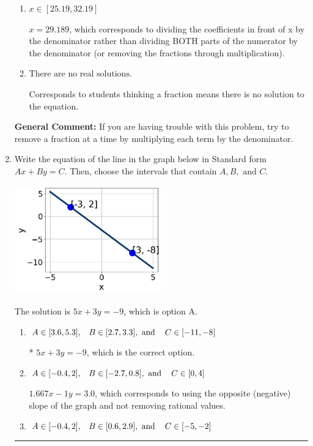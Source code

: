 \documentclass{extbook}[14pt]
\newcommand{\litem}[1]{\item #1

\rule{\textwidth}{0.4pt}}
\begin{document}
\begin{enumerate}
{\begin{enumerate}[label=\Alph*.]
 $x = -1.865$, which corresponds to not distributing the negative in front of the second fraction.
\item \( x \in [25.19, 32.19] \)

 $x = 29.189$, which corresponds to dividing the coefficients in front of x by the denominator rather than dividing BOTH parts of the numerator by the denominator (or removing the fractions through multiplication).
\item \( \text{There are no real solutions.} \)

Corresponds to students thinking a fraction means there is no solution to the equation.
\end{enumerate}

\textbf{General Comment:} If you are having trouble with this problem, try to remove a fraction at a time by multiplying each term by the denominator.
}
\litem{
Write the equation of the line in the graph below in Standard form $Ax+By=C$. Then, choose the intervals that contain $A, B, \text{ and } C$.

\begin{center}
    \includegraphics[width=0.5\textwidth]{../Figures/linearGraphToStandardC.png}
\end{center}



The solution is \( 5x + 3y = -9 \), which is option A.\begin{enumerate}[label=\Alph*.]
\item \( A \in [3.6, 5.3], \hspace{3mm} B \in [2.7, 3.3], \text{ and } \hspace{3mm} C \in [-11, -8] \)

* $5x + 3y = -9$, which is the correct option.
\item \( A \in [-0.4, 2], \hspace{3mm} B \in [-2.7, 0.8], \text{ and } \hspace{3mm} C \in [0, 4] \)

 $1.667x - 1y = 3.0$, which corresponds to using the opposite (negative) slope of the graph and not removing rational values.
\item \( A \in [-0.4, 2], \hspace{3mm} B \in [0.6, 2.9], \text{ and } \hspace{3mm} C \in [-5, -2] \)


\end{enumerate}}
\end{enumerate}
\end{document}
